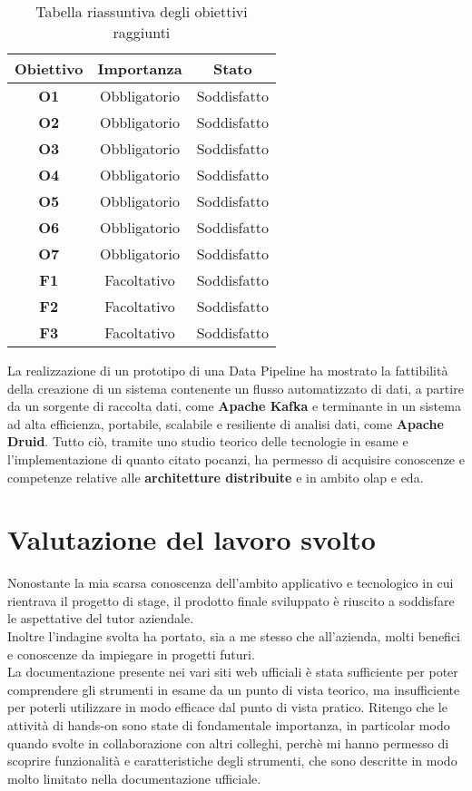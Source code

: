 \begin{table}[H]
    \centering
    \caption{Tabella riassuntiva degli obiettivi raggiunti}
    \label{tab:obiettivi_raggiunti}
    \begin{tabular}{|c|c|c|}
        \hline
        \textbf{Obiettivo} & \textbf{Importanza} & \textbf{Stato} \\\hline
        \textbf{O1} & Obbligatorio & Soddisfatto \\\hline
        \textbf{O2} & Obbligatorio & Soddisfatto\\\hline
        \textbf{O3} & Obbligatorio & Soddisfatto\\\hline
        \textbf{O4} & Obbligatorio & Soddisfatto \\ \hline
        \textbf{O5} & Obbligatorio & Soddisfatto \\\hline
        \textbf{O6} & Obbligatorio & Soddisfatto \\\hline
        \textbf{O7} & Obbligatorio & Soddisfatto \\\hline
        \textbf{F1} & Facoltativo & Soddisfatto\\\hline
        \textbf{F2} & Facoltativo & Soddisfatto \\\hline
        \textbf{F3} & Facoltativo & Soddisfatto\\\hline
    \end{tabular} 
\end{table}
\pagebreak
\noindent
La realizzazione di un prototipo di una \gls{Data Pipeline}{} ha mostrato la fattibilità della creazione di un sistema contenente un flusso automatizzato
di dati, a partire da un sorgente di raccolta dati, come \textbf{Apache Kafka} e terminante in un sistema ad alta efficienza, portabile, scalabile e resiliente di analisi dati, come \textbf{Apache Druid}.
Tutto ciò, tramite uno studio teorico delle tecnologie in esame e l'implementazione di quanto citato pocanzi, ha permesso di 
acquisire conoscenze e competenze relative alle \textbf{architetture distribuite} e in ambito \gls{olap}{} e \gls{eda}{}.  
\section{Valutazione del lavoro svolto}
Nonostante la mia scarsa conoscenza dell'ambito applicativo e tecnologico in cui rientrava il progetto di stage,
il prodotto finale sviluppato è riuscito a soddisfare le aspettative del tutor aziendale.\\
Inoltre l'indagine svolta 
ha portato, sia a me stesso che all'azienda,
 molti benefici e conoscenze da impiegare in progetti futuri.\\
La documentazione presente nei vari siti web ufficiali è stata sufficiente per poter comprendere gli strumenti in esame
da un punto di vista teorico, ma insufficiente 
per poterli utilizzare in modo efficace dal punto di vista pratico. Ritengo che 
le attività di \gls{hands-on}{} sono state di fondamentale importanza, in particolar modo 
quando svolte in collaborazione con altri colleghi, perchè mi hanno permesso di 
scoprire funzionalità e caratteristiche degli strumenti, che sono descritte in modo molto limitato nella documentazione ufficiale.\\
\newpage
\pagestyle{empty}
\null %
\newpage